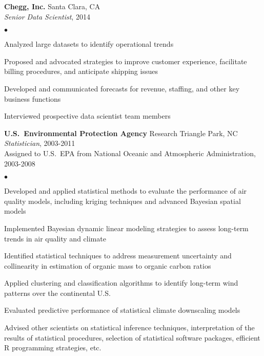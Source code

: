 \documentclass[11pt]{article}
\def\newempl{\vspace*{0.4cm}}
\begin{document}
\newempl
\textbf{Chegg, Inc.}  \hfill Santa Clara, CA\\
\textit{Senior Data Scientist}, 2014 %

\begin{list}{$\bullet$}{
\setlength{\topsep}{0cm}
\setlength{\partopsep}{0cm}
\setlength{\parsep}{0cm}
\setlength{\itemsep}{0cm}
\setlength{\labelsep}{1ex}
\setlength{\labelwidth}{1em}
\setlength{\leftmargin}{1em}
}
\item Analyzed large datasets to identify operational trends %
\item Proposed and advocated strategies to improve customer experience, facilitate billing procedures, and anticipate shipping issues
\item Developed and communicated forecasts for revenue, staffing, and other key business functions
\item Interviewed prospective data scientist team members
\end{list}



\newempl
\textbf{U.S.\ Environmental Protection Agency}  \hfill Research Triangle Park, NC\\
\textit{Statistician}, 2003-2011\\
Assigned to U.S.~EPA from National Oceanic and Atmospheric Administration,
2003-2008

\begin{list}{$\bullet$}{
\setlength{\topsep}{0cm}
\setlength{\partopsep}{0cm}
\setlength{\parsep}{0cm}
\setlength{\itemsep}{0cm}
\setlength{\labelsep}{1ex}
\setlength{\labelwidth}{1em}
\setlength{\leftmargin}{1em}
}
\item Developed and applied statistical methods to evaluate the performance of air quality models, including kriging techniques and advanced Bayesian spatial models
\item Implemented Bayesian dynamic linear modeling strategies to assess long-term trends in air quality and climate
\item Identified statistical techniques to address measurement uncertainty and collinearity in estimation of organic mass to organic carbon ratios
\item Applied clustering and classification algorithms to identify long-term wind patterns over the continental U.S.
\item Evaluated predictive performance of statistical climate
  downscaling models
\item Advised other scientists on statistical inference techniques,
  interpretation of the results of statistical procedures, selection
  of statistical software packages, efficient R programming strategies, etc.
\end{list}
\end{document}
